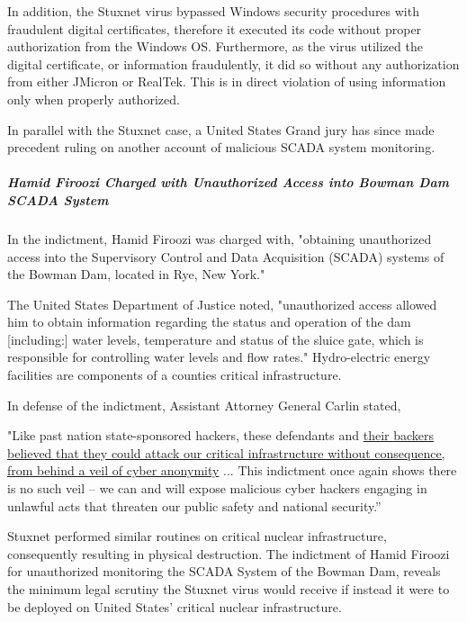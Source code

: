 \documentclass[12pt]{article}
\begin{document}
\begin{multicols}{2}
In addition, the Stuxnet virus bypassed Windows security procedures with fraudulent digital certificates, therefore it executed its code without proper authorization from the Windows OS. Furthermore, as the virus utilized the digital certificate, or information fraudulently, it did so without any authorization from either JMicron or RealTek.\cite{signedUsingCertificates} This is in direct violation of using information only when properly authorized.

In parallel with the Stuxnet case, a United States Grand jury has since made precedent ruling on another account of malicious SCADA system monitoring.

\subparagraph{Hamid Firoozi Charged with Unauthorized Access into Bowman Dam SCADA System}

In the indictment, Hamid Firoozi was charged with, "obtaining unauthorized access into the Supervisory Control and Data Acquisition (SCADA) systems of the Bowman Dam, located in Rye, New York."\cite{sevenIraniansIndicted}

The United States Department of Justice noted, "unauthorized access allowed him to obtain information regarding the status and operation of the dam [including:] water levels, temperature and status of the sluice gate, which is responsible for controlling water levels and flow rates."\cite{sevenIraniansIndicted} Hydro-electric energy facilities are components of a counties critical infrastructure.

In defense of the indictment, Assistant Attorney General Carlin stated,

\begin{displayquote}
"Like past nation state-sponsored hackers, these defendants and \ul{their backers believed that they could attack our critical infrastructure without consequence, from behind a veil of cyber anonymity} ... This indictment once again shows there is no such veil – we can and will expose malicious cyber hackers engaging in unlawful acts that threaten our public safety and national security.”\cite{sevenIraniansIndicted}
\end{displayquote}

Stuxnet performed similar routines on critical nuclear infrastructure, consequently resulting in physical destruction. The indictment of Hamid Firoozi for unauthorized monitoring the SCADA System of the Bowman Dam, reveals the minimum legal scrutiny the Stuxnet virus would receive if instead it were to be deployed on United States' critical nuclear infrastructure.


\end{multicols}
\end{document}
